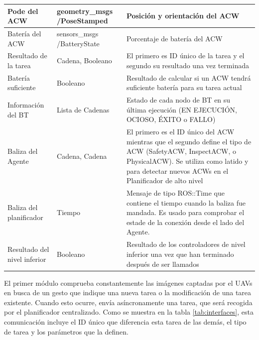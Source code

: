 \documentclass[fontsize=11pt, English=false, Español=true, Myfinal=true, twoside, numbers=noenddot]{scrbook}
\begin{document}
\begin{table}[htb]
\begin{tabular}{|p{}|p{}|p{}|}
      Pode del \gls{ACW} & geometry\_msgs /PoseStamped & Posición y orientación del \gls{ACW}\\ \hline
      
      Batería del \gls{ACW} & sensors\_msgs /BatteryState & Porcentaje de batería del \gls{ACW} \\ \hline

	    Resultado de la tarea & Cadena, Booleano & El primero es \gls{ID} único de la tarea y el segundo su resultado una vez terminada \\ \hline
      
      Batería suficiente & Booleano & Resultado de calcular si un \gls{ACW} tendrá suficiente batería para su tarea actual \\ \hline

	    Información del \gls{BT} & Lista de Cadenas & Estado de cada nodo de \gls{BT} en su última ejecución (EN EJECUCIÓN, OCIOSO, ÉXITO o FALLO) \\ \hline
      
      Baliza del Agente & Cadena, Cadena & El primero es el ID único del \gls{ACW} mientras que el segundo define el tipo de \gls{ACW} (SafetyACW, InspectACW, o PhysicalACW). Se utiliza como latido y para detectar nuevos \glspl{ACW} en el Planificador de alto nivel \\ \hline

	    Baliza del planificador & Tiempo & Mensaje de tipo ROS::Time que contiene el tiempo cuando la baliza fue mandada. Es usado para comprobar el estade de la conexión desde el lado del Agente. \\ \hline
      
      Resultado del nivel inferior & Booleano & Resultado de los controladores de nivel inferior una vez que han terminado después de ser llamados \\ \hline
      
    \end{tabular}
\end{table}

El primer módulo comprueba constantemente las imágenes captadas por el \glspl{UAV} en busca de un gesto que indique una nueva tarea o la modificación de una tarea existente. Cuando esto ocurre, envía asíncronamente una tarea, que será recogida por el planificador centralizado. Como se muestra en la tabla \ref{tab:interfaces}, esta comunicación incluye el \gls{ID} único que diferencia esta tarea de las demás, el tipo de tarea y los parámetros que la definen.
\end{document}
